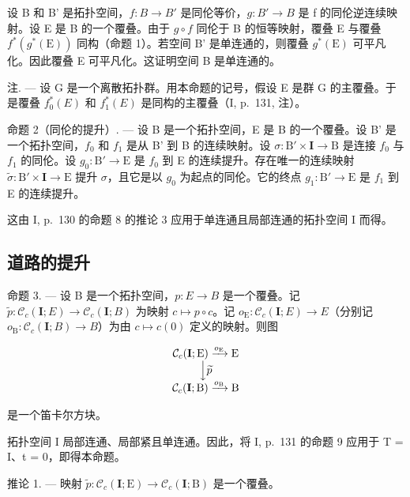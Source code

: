 设 B 和 B' 是拓扑空间，\(f: B \rightarrow B'\) 是同伦等价，\(g: B' \rightarrow B\) 是 f 的同伦逆连续映射。设 E 是 B 的一个覆叠。由于 \(g \circ f\) 同伦于 B 的恒等映射，覆叠 E 与覆叠 \(f^{*}(g^{*}(\mathrm{E}))\) 同构（命题 1）。若空间 B' 是单连通的，则覆叠 \(g^{*}(\mathrm{E})\) 可平凡化。因此覆叠 E 可平凡化。这证明空间 B 是单连通的。

注. --- 设 G 是一个离散拓扑群。用本命题的记号，假设 E 是群 G 的主覆叠。于是覆叠 \(f_{0}^{*}(E)\) 和 \(f_{1}^{*}(E)\) 是同构的主覆叠（I, p.~131, 注）。

命题 2（同伦的提升）. --- 设 B 是一个拓扑空间，E 是 B 的一个覆叠。设 B' 是一个拓扑空间，\(f_0\) 和 \(f_1\) 是从 B' 到 B 的连续映射。设 \(\sigma: \mathrm{B}' \times \mathbf{I} \to \mathrm{B}\) 是连接 \(f_0\) 与 \(f_1\) 的同伦。设 \(g_0: \mathrm{B}' \to \mathrm{E}\) 是 \(f_0\) 到 E 的连续提升。存在唯一的连续映射 \(\widetilde{\sigma}: \mathrm{B}' \times \mathbf{I} \to \mathrm{E}\) 提升 \(\sigma\)，且它是以 \(g_0\) 为起点的同伦。它的终点 \(g_1: \mathrm{B}' \to \mathrm{E}\) 是 \(f_1\) 到 E 的连续提升。

这由 I, p.~130 的命题 8 的推论 3 应用于单连通且局部连通的拓扑空间 I 而得。

\subsection{道路的提升}

命题 3. --- 设 B 是一个拓扑空间，\(p\colon E \to B\) 是一个覆叠。记 \(\widetilde{p}\colon \mathcal{C}_{c}(\mathbf{I};E) \to \mathcal{C}_{c}(\mathbf{I};B)\) 为映射 \(c \mapsto p \circ c\)。记 \(o_{\mathrm{E}}\colon \mathcal{C}_{c}(\mathbf{I};E) \to E\)（分别记 \(o_{\mathrm{B}}\colon \mathcal{C}_{c}(\mathbf{I};B) \to B\)）为由 \(c \mapsto c(0)\) 定义的映射。则图

\[
\begin{array}{c} \mathcal {C} _ {c} (\mathbf {I}; \mathrm{E}) \xrightarrow {o _ {\mathrm{E}}} \mathrm{E} \\ \Big \downarrow \widetilde {p} \\ \mathcal {C} _ {c} (\mathbf {I}; \mathrm{B}) \xrightarrow {o _ {\mathrm{B}}} \mathrm{B} \end{array}
\]

是一个笛卡尔方块。

拓扑空间 I 局部连通、局部紧且单连通。因此，将 I, p.~131 的命题 9 应用于 T = I、t = 0，即得本命题。

推论 1. --- 映射 \(\widetilde{p}\colon\mathcal{C}_{c}(\mathbf{I};\mathrm{E})\to\mathcal{C}_{c}(\mathbf{I};\mathrm{B})\) 是一个覆叠。

